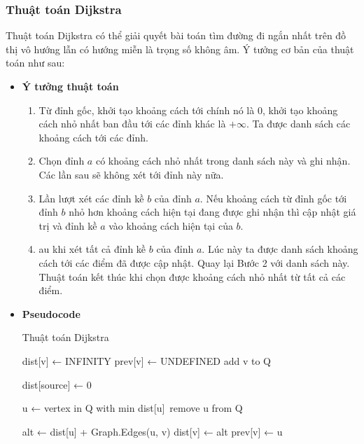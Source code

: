 \documentclass[a4paper]{article}
\begin{document}
\subsubsection{Thuật toán Dijkstra}
Thuật toán Dijkstra có thể giải quyết bài toán tìm đường đi ngắn nhất trên đồ thị vô hướng lẫn có hướng miễn là trọng số không âm. Ý tưởng cơ bản của thuật toán như sau:
\begin{itemize}
\item \textbf{Ý tưởng thuật toán}
\begin{enumerate}
    \item Từ đỉnh gốc, khởi tạo khoảng cách tới chính nó là 0, khởi tạo khoảng cách nhỏ nhất ban đầu tới các đỉnh khác là $+\infty$. Ta được danh sách các khoảng cách tới các đỉnh.
    \item Chọn đỉnh $a$ có khoảng cách nhỏ nhất trong danh sách này và ghi nhận. Các lần sau sẽ không xét tới đỉnh này nữa.
    \item Lần lượt xét các đỉnh kề $b$ của đỉnh $a$. Nếu khoảng cách từ đỉnh gốc tới đỉnh $b$ nhỏ hơn khoảng cách hiện tại đang được ghi nhận thì cập nhật giá trị và đỉnh kề $a$ vào khoảng cách hiện tại của $b$.
    \item au khi xét tất cả đỉnh kề $b$ của đỉnh $a$. Lúc này ta được danh sách khoảng cách tới các điểm đã được cập nhật. Quay lại Bước 2 với danh sách này. Thuật toán kết thúc khi chọn được khoảng cách nhỏ nhất từ tất cả các điểm.
\end{enumerate}
\item \textbf{Pseudocode}
\begin{algorithm}[H]
\caption{Thuật toán Dijkstra}\label{alg:cap}
\begin{algorithmic}[1]


        \State dist[v] ← INFINITY
        \State prev[v] ← UNDEFINED
        \State add v to Q
    \EndFor
    
\State dist[source] ← 0

        \State u ← vertex in Q with min dist[u]\
        \State remove u from Q
    \EndWhile
    
        \State alt ← dist[u] + Graph.Edges(u, v)
            \State dist[v] ← alt
            \State prev[v] ← u
        \EndIf
    \EndFor
    

\end{algorithmic}
\end{algorithm}
\end{itemize}
\end{document}
